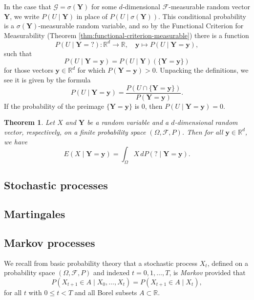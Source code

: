 \documentclass[reqno]{amsart}
\newtheorem{thm}{Theorem}[section]
\theoremstyle{definition}
\numberwithin{equation}{section}
\begin{document}
In the case that $\mathcal{G} = \sigma(\mathbf{Y})$ for some $d$-dimensional $\mathcal{F}$-measurable random vector $\mathbf{Y}$, we write $P(U \mid \mathbf{Y})$ in place of $P(U \mid \sigma(\mathbf{Y}))$. This conditional probability is a $\sigma(\mathbf{Y})$-measurable random variable, and so by the Functional Criterion for Measurability (Theorem \ref{thm:functional-criterion-measurable}) there is a function
	\[
	P(U \mid \mathbf{Y} = {?}): \mathbb{R}^d \to \mathbb{R}, \quad \mathbf{y} \mapsto P(U \mid \mathbf{Y} = \mathbf{y}),
	\]
such that
	\[
	P(U \mid \mathbf{Y} = \mathbf{y}) = P(U \mid \mathbf{Y})(\{\mathbf{Y} = \mathbf{y}\})
	\]
for those vectors $\mathbf{y}\in \mathbb{R}^d$ for which $P(\mathbf{Y} = \mathbf{y})>0$. Unpacking the definitions, we see it is given by the formula
	\[
	P(U \mid \mathbf{Y} = \mathbf{y}) = \frac{P\left(U \cap \{\mathbf{Y} = \mathbf{y}\} \right)}{P(\mathbf{Y} = \mathbf{y})}.
	\]
If the probability of the preimage $\{\mathbf{Y}=\mathbf{y}\}$ is $0$, then $P(U \mid \mathbf{Y} = \mathbf{y})=0$.

\begin{thm}\label{thm:cond-exp-familiar}
Let $X$ and $\mathbf{Y}$ be a random variable and a $d$-dimensional random vector, respectively, on a finite probability space $(\Omega, \mathcal{F}, P)$. Then for all $\mathbf{y}\in \mathbb{R}^d$, we have
	\[
	E(X \mid \mathbf{Y} = \mathbf{y}) = \int_\Omega X \, dP({?} \mid \mathbf{Y}=\mathbf{y}).
	\]
\end{thm}

\subsection{Stochastic processes}

\subsection{Martingales}

\subsection{Markov processes}

We recall from basic probability theory that a stochastic process $X_t$, defined on a probability space $(\Omega, \mathcal{F}, P)$ and indexed $t=0,1,\ldots,T$, is \textit{Markov} provided that
	\begin{equation}\label{eq:markov}
	P\left( X_{t+1} \in A \mid X_0, \ldots,X_t \right) = P \left( X_{t+1} \in A \mid X_t \right),
	\end{equation}
for all $t$ with $0\leq t < T$ and all Borel subsets $A\subset \mathbb{R}$.
\end{document}
